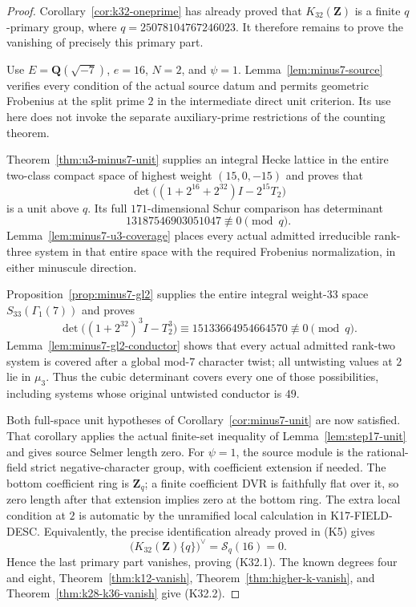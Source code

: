 \documentclass[11pt,a4paper]{article}
\theoremstyle{definition}
\begin{document}
\begin{proof}
Corollary~\ref{cor:k32-oneprime} has already proved that
$K_{32}(\mathbf Z)$ is a finite $q$-primary group, where
$q=25078104767246023$. It therefore remains to prove the vanishing
of precisely this primary part.

Use $E=\mathbf Q(\sqrt{-7})$, $e=16$, $N=2$, and $\psi=1$.
Lemma~\ref{lem:minus7-source} verifies every condition of the actual
source datum and permits geometric Frobenius at the split prime $2$
in the intermediate direct unit criterion. Its use here does not
invoke the separate auxiliary-prime restrictions of the counting
theorem.

Theorem~\ref{thm:u3-minus7-unit} supplies an integral Hecke lattice
in the entire two-class compact space of highest weight $(15,0,-15)$
and proves that
\[
       \det\bigl((1+2^{16}+2^{32})I-2^{15}T_2\bigr)
\]
is a unit above $q$. Its full $171$-dimensional Schur comparison
has determinant
\[
                    13187546903051047\not\equiv0\pmod q.
\]
Lemma~\ref{lem:minus7-u3-coverage} places every actual admitted
irreducible rank-three system in that entire space with the required
Frobenius normalization, in either minuscule direction.

Proposition~\ref{prop:minus7-gl2} supplies the entire integral
weight-$33$ space $S_{33}(\Gamma_1(7))$ and proves
\[
 \det\bigl((1+2^{32})^3I-T_2^3\bigr)
       \equiv15133664954664570\not\equiv0\pmod q.
\]
Lemma~\ref{lem:minus7-gl2-conductor} shows that every actual
admitted rank-two system is covered after a global mod-$7$ character
twist; all untwisting values at $2$ lie in $\mu_3$.
Thus the cubic determinant covers every one of those possibilities,
including systems whose original untwisted conductor is $49$.

Both full-space unit hypotheses of Corollary~\ref{cor:minus7-unit}
are now satisfied. That corollary applies the actual finite-set
inequality of Lemma~\ref{lem:step17-unit} and gives source Selmer
length zero. For $\psi=1$, the source module is the rational-field
strict negative-character group, with coefficient extension if
needed. The bottom coefficient ring is $\mathbf Z_q$; a finite
coefficient DVR is faithfully flat over it, so zero length after
that extension implies zero at the bottom ring. The extra local
condition at $2$ is automatic by the unramified local calculation
in K17-FIELD-DESC. Equivalently, the precise identification already
proved in (K5) gives
\[
       \bigl(K_{32}(\mathbf Z)\{q\}\bigr)^\vee
                        =\mathcal S_q(16)=0.
\]
Hence the last primary part vanishes, proving (K32.1).
The known degrees four and eight, Theorem~\ref{thm:k12-vanish},
Theorem~\ref{thm:higher-k-vanish}, and
Theorem~\ref{thm:k28-k36-vanish} give (K32.2).


\end{proof}
\end{document}

